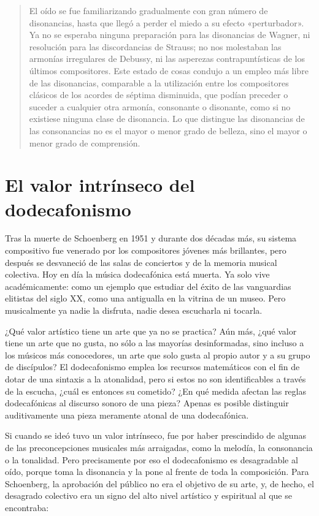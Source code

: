     \begin{quote}
    	El oído se fue familiarizando gradualmente con gran número de disonancias, hasta que llegó a perder el miedo a su efecto «perturbador». Ya no se esperaba ninguna preparación para las disonancias de Wagner, ni resolución para las discordancias de Strauss; no nos molestaban las armonías irregulares de Debussy, ni las asperezas contrapuntísticas de los últimos compositores. Este estado de cosas condujo a un empleo más libre de las disonancias, comparable a la utilización entre los compositores clásicos de los acordes de séptima disminuida, que podían preceder o suceder a cualquier otra armonía, consonante o disonante, como si no existiese ninguna clase de disonancia. Lo que distingue las disonancias de las consonancias no es el mayor o menor grado de belleza, sino el mayor o menor grado de comprensión.
    \end{quote}
        
     
	\section{El valor intrínseco del dodecafonismo}
	Tras la muerte de Schoenberg en 1951 y durante dos décadas más, su sistema compositivo fue venerado por los compositores jóvenes más brillantes, pero después se desvaneció de las salas de conciertos y de la memoria musical colectiva. Hoy en día la música dodecafónica está muerta. Ya solo vive académicamente: como un ejemplo que estudiar del éxito de las vanguardias elitistas del siglo XX, como una antigualla en la vitrina de un museo. Pero musicalmente ya nadie la disfruta, nadie desea escucharla ni tocarla.
	
	¿Qué valor artístico tiene un arte que ya no se practica? Aún más, ¿qué valor tiene un arte que no gusta, no sólo a las mayorías desinformadas, sino incluso a los músicos más conocedores, un arte que solo gusta al propio autor y a su grupo de discípulos? El dodecafonismo emplea los recursos matemáticos con el fin de dotar de una sintaxis a la atonalidad, pero si estos no son identificables a través de la escucha, ¿cuál es entonces su cometido? ¿En qué medida afectan las reglas dodecafónicas al discurso sonoro de una pieza? Apenas es posible distinguir auditivamente una pieza meramente atonal de una dodecafónica. \cite{basomba}
	
	Si cuando se ideó tuvo un valor intrínseco, fue por haber prescindido de algunas de las preconcepciones musicales más arraigadas, como la melodía, la consonancia o la tonalidad. Pero precisamente por eso el dodecafonismo es desagradable al oído, porque toma la disonancia y la pone al frente de toda la composición. Para Schoenberg, la aprobación del público no era el objetivo de su arte, y, de hecho, el desagrado colectivo era un signo del alto nivel artístico y espiritual al que se encontraba:
	
